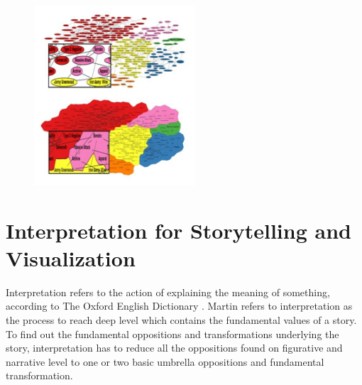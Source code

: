 \documentclass{egpubl}
\begin{document}
\begin{figure}
\begingroup
\centering
\includegraphics[width=6cm]{./images/saket2015}
\label{fig:saket2015}
\endgroup
\end{figure}

\section{Interpretation for Storytelling and Visualization}
Interpretation refers to the action of explaining the meaning of something, according to The Oxford English Dictionary \cite{Interpretation}. Martin\cite{Martin1997} refers to interpretation as the process to reach deep level which contains the fundamental values of a story.  To find out the fundamental oppositions and transformations underlying the story, interpretation has to reduce all the oppositions found on figurative and narrative level to one or two basic umbrella oppositions and fundamental transformation.
\end{document}
